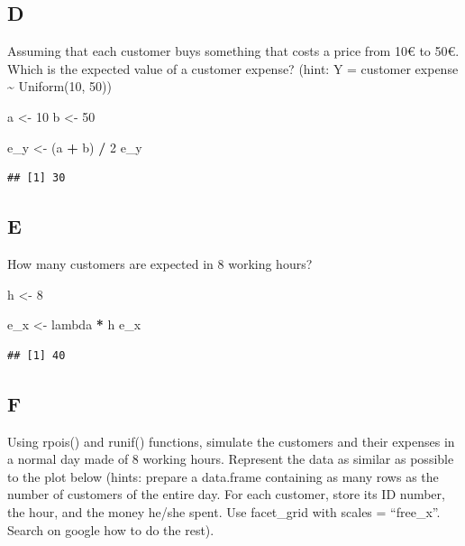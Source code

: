 \documentclass[
]{article}
\newenvironment{Shaded}{\begin{snugshade}}{\end{snugshade}}
\newcommand{\DecValTok}[1]{\textcolor[rgb]{0.00,0.00,0.81}{#1}}
\newcommand{\NormalTok}[1]{#1}
\newcommand{\OperatorTok}[1]{\textcolor[rgb]{0.81,0.36,0.00}{\textbf{#1}}}
\newcommand{\StringTok}[1]{\textcolor[rgb]{0.31,0.60,0.02}{#1}}
\begin{document}
\hypertarget{d}{%
\subsection{D}\label{d}}

Assuming that each customer buys something that costs a price from 10€
to 50€. Which is the expected value of a customer expense? (hint: Y =
customer expense \textasciitilde{} Uniform(10, 50))

\begin{Shaded}
\begin{Highlighting}[]
\NormalTok{a \textless{}{-}}\StringTok{ }\DecValTok{10}
\NormalTok{b \textless{}{-}}\StringTok{ }\DecValTok{50}

\NormalTok{e\_y \textless{}{-}}\StringTok{ }\NormalTok{(a }\OperatorTok{+}\StringTok{ }\NormalTok{b) }\OperatorTok{/}\StringTok{ }\DecValTok{2}
\NormalTok{e\_y}
\end{Highlighting}
\end{Shaded}

\begin{verbatim}
## [1] 30
\end{verbatim}

\hypertarget{e}{%
\subsection{E}\label{e}}

How many customers are expected in 8 working hours?

\begin{Shaded}
\begin{Highlighting}[]
\NormalTok{h \textless{}{-}}\StringTok{ }\DecValTok{8}

\NormalTok{e\_x \textless{}{-}}\StringTok{ }\NormalTok{lambda }\OperatorTok{*}\StringTok{ }\NormalTok{h}
\NormalTok{e\_x}
\end{Highlighting}
\end{Shaded}

\begin{verbatim}
## [1] 40
\end{verbatim}

\hypertarget{f}{%
\subsection{F}\label{f}}

Using rpois() and runif() functions, simulate the customers and their
expenses in a normal day made of 8 working hours. Represent the data as
similar as possible to the plot below (hints: prepare a data.frame
containing as many rows as the number of customers of the entire day.
For each customer, store its ID number, the hour, and the money he/she
spent. Use facet\_grid with scales = ``free\_x''. Search on google how
to do the rest).
\end{document}
